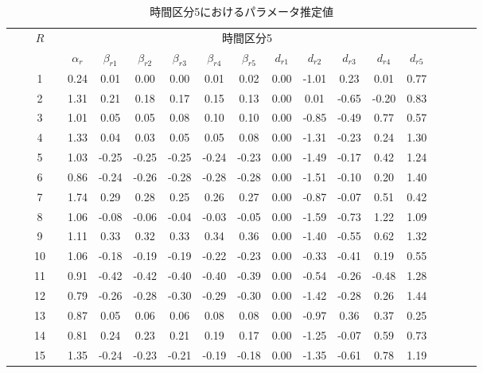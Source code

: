 \documentclass[a4paper,11pt,oneside,openany]{jsbook}
\newcommand{\bhline}[1]{\noalign{\hrule height #1}}
\begin{document}
\begin{table}[h!]
\begin{center}
\caption{時間区分5におけるパラメータ推定値}
\setlength{\tabcolsep}{5.pt}
\begin{tabular}{ccccccccccccccccccc}  
\bhline{1pt}
& & \multirow{2}{*}{$R$} & & \multicolumn{11}{c}{時間区分5}     \\
\cline{5-15}
  & &  & & $\alpha_r$ & $\beta_{r1}$ & $\beta_{r2}$ & $\beta_{r3}$ & $\beta_{r4}$ & $\beta_{r5}$ & $d_{r1}$ & $d_{r2}$ & $d_{r3}$ & $d_{r4}$ & $d_{r5}$ \\
\bhline{1pt}
 &  & 1  &  & 0.24 & 0.01  & 0.00  & 0.00  & 0.01  & 0.02  & 0.00 & -1.01 & 0.23  & 0.01  & 0.77 \\
 &  & 2  &  & 1.31 & 0.21  & 0.18  & 0.17  & 0.15  & 0.13  & 0.00 & 0.01  & -0.65 & -0.20 & 0.83 \\
 &  & 3  &  & 1.01 & 0.05  & 0.05  & 0.08  & 0.10  & 0.10  & 0.00 & -0.85 & -0.49 & 0.77  & 0.57 \\
 &  & 4  &  & 1.33 & 0.04  & 0.03  & 0.05  & 0.05  & 0.08  & 0.00 & -1.31 & -0.23 & 0.24  & 1.30 \\
 &  & 5  &  & 1.03 & -0.25 & -0.25 & -0.25 & -0.24 & -0.23 & 0.00 & -1.49 & -0.17 & 0.42  & 1.24 \\
 &  & 6  &  & 0.86 & -0.24 & -0.26 & -0.28 & -0.28 & -0.28 & 0.00 & -1.51 & -0.10 & 0.20  & 1.40 \\
 &  & 7  &  & 1.74 & 0.29  & 0.28  & 0.25  & 0.26  & 0.27  & 0.00 & -0.87 & -0.07 & 0.51  & 0.42 \\
 &  & 8  &  & 1.06 & -0.08 & -0.06 & -0.04 & -0.03 & -0.05 & 0.00 & -1.59 & -0.73 & 1.22  & 1.09 \\
 &  & 9  &  & 1.11 & 0.33  & 0.32  & 0.33  & 0.34  & 0.36  & 0.00 & -1.40 & -0.55 & 0.62  & 1.32 \\
 &  & 10 &  & 1.06 & -0.18 & -0.19 & -0.19 & -0.22 & -0.23 & 0.00 & -0.33 & -0.41 & 0.19  & 0.55 \\
 &  & 11 &  & 0.91 & -0.42 & -0.42 & -0.40 & -0.40 & -0.39 & 0.00 & -0.54 & -0.26 & -0.48 & 1.28 \\
 &  & 12 &  & 0.79 & -0.26 & -0.28 & -0.30 & -0.29 & -0.30 & 0.00 & -1.42 & -0.28 & 0.26  & 1.44 \\
 &  & 13 &  & 0.87 & 0.05  & 0.06  & 0.06  & 0.08  & 0.08  & 0.00 & -0.97 & 0.36  & 0.37  & 0.25 \\
 &  & 14 &  & 0.81 & 0.24  & 0.23  & 0.21  & 0.19  & 0.17  & 0.00 & -1.25 & -0.07 & 0.59  & 0.73 \\
 &  & 15 &  & 1.35 & -0.24 & -0.23 & -0.21 & -0.19 & -0.18 & 0.00 & -1.35 & -0.61 & 0.78  & 1.19 \\

\end{tabular}
\end{center}
\end{table}
\end{document}
